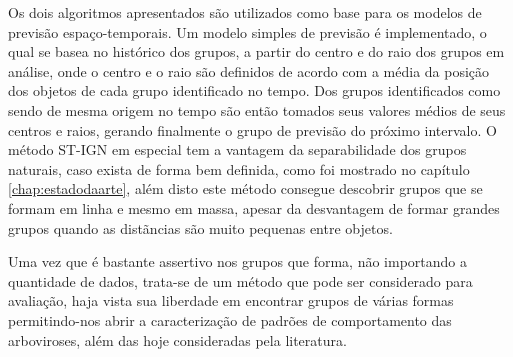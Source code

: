 Os dois algoritmos apresentados são utilizados como base para os modelos de previsão espaço-temporais. Um modelo simples de previsão é implementado, o qual se basea no histórico dos grupos, a partir do centro e do raio dos grupos em análise, onde o centro e o raio são definidos de acordo com a média da posição dos objetos de cada grupo identificado no tempo. Dos grupos identificados como sendo de mesma origem no tempo são então tomados seus valores médios de seus centros e raios, gerando finalmente o grupo de previsão do próximo intervalo. O método \acrshort{ST-IGN} em especial tem a vantagem da separabilidade dos grupos naturais, caso exista de forma bem definida, como foi mostrado no capítulo \ref{chap:estadodaarte}, além disto este método consegue descobrir grupos que se formam em linha e mesmo em massa, apesar da desvantagem de formar grandes grupos quando as distãncias são muito pequenas entre objetos.

Uma vez que é bastante assertivo nos grupos que forma, não importando a quantidade de dados, trata-se de um método que pode ser considerado para avaliação, haja vista sua liberdade em encontrar grupos de várias formas permitindo-nos abrir a caracterização de padrões de comportamento das arboviroses, além das hoje consideradas pela literatura.